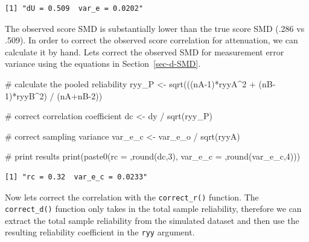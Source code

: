 \documentclass[
  letterpaper,
  DIV=11,
  numbers=noendperiod]{scrreprt}
\newenvironment{Shaded}{\begin{snugshade}}{\end{snugshade}}
\newcommand{\CommentTok}[1]{\textcolor[rgb]{0.37,0.37,0.37}{#1}}
\newcommand{\DecValTok}[1]{\textcolor[rgb]{0.68,0.00,0.00}{#1}}
\newcommand{\FunctionTok}[1]{\textcolor[rgb]{0.28,0.35,0.67}{#1}}
\newcommand{\NormalTok}[1]{\textcolor[rgb]{0.00,0.23,0.31}{#1}}
\newcommand{\OtherTok}[1]{\textcolor[rgb]{0.00,0.23,0.31}{#1}}
\newcommand{\SpecialCharTok}[1]{\textcolor[rgb]{0.37,0.37,0.37}{#1}}
\newcommand{\StringTok}[1]{\textcolor[rgb]{0.13,0.47,0.30}{#1}}
\begin{document}
\begin{verbatim}
[1] "dU = 0.509  var_e = 0.0202"
\end{verbatim}

The observed score SMD is substantially lower than the true score SMD
(.286 vs .509). In order to correct the observed score correlation for
attenuation, we can calculate it by hand. Lets correct the observed SMD
for measurement error variance using the equations in
Section~\ref{sec-d-SMD}.

\begin{Shaded}
\begin{Highlighting}[]
\CommentTok{\# calculate the pooled reliability}
\NormalTok{ryy\_P }\OtherTok{\textless{}{-}} \FunctionTok{sqrt}\NormalTok{(((nA}\DecValTok{{-}1}\NormalTok{)}\SpecialCharTok{*}\NormalTok{ryyA}\SpecialCharTok{\^{}}\DecValTok{2} \SpecialCharTok{+}\NormalTok{ (nB}\DecValTok{{-}1}\NormalTok{)}\SpecialCharTok{*}\NormalTok{ryyB}\SpecialCharTok{\^{}}\DecValTok{2}\NormalTok{) }\SpecialCharTok{/}\NormalTok{ (nA}\SpecialCharTok{+}\NormalTok{nB}\DecValTok{{-}2}\NormalTok{))}

\CommentTok{\# correct correlation coefficient}
\NormalTok{dc }\OtherTok{\textless{}{-}}\NormalTok{ dy }\SpecialCharTok{/} \FunctionTok{sqrt}\NormalTok{(ryy\_P)}

\CommentTok{\# correct sampling variance}
\NormalTok{var\_e\_c }\OtherTok{\textless{}{-}}\NormalTok{ var\_e\_o }\SpecialCharTok{/} \FunctionTok{sqrt}\NormalTok{(ryyA)}

\CommentTok{\# print results}
\FunctionTok{print}\NormalTok{(}\FunctionTok{paste0}\NormalTok{(}\StringTok{\textquotesingle{}rc = \textquotesingle{}}\NormalTok{,}\FunctionTok{round}\NormalTok{(dc,}\DecValTok{3}\NormalTok{),}\StringTok{\textquotesingle{}  var\_e\_c = \textquotesingle{}}\NormalTok{,}\FunctionTok{round}\NormalTok{(var\_e\_c,}\DecValTok{4}\NormalTok{)))}
\end{Highlighting}
\end{Shaded}

\begin{verbatim}
[1] "rc = 0.32  var_e_c = 0.0233"
\end{verbatim}

Now lets correct the correlation with the \texttt{correct\_r()}
function. The \texttt{correct\_d()} function only takes in the total
sample reliability, therefore we can extract the total sample
reliability from the simulated dataset and then use the resulting
reliability coefficient in the \texttt{ryy} argument.
\end{document}
